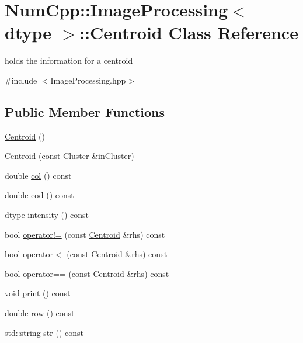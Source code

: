 \hypertarget{class_num_cpp_1_1_image_processing_1_1_centroid}{}\section{Num\+Cpp\+:\+:Image\+Processing$<$ dtype $>$\+:\+:Centroid Class Reference}
\label{class_num_cpp_1_1_image_processing_1_1_centroid}


holds the information for a centroid  




{\ttfamily \#include $<$Image\+Processing.\+hpp$>$}

\subsection*{Public Member Functions}
\begin{DoxyCompactItemize}
\item 
\mbox{\hyperlink{class_num_cpp_1_1_image_processing_1_1_centroid_a75c8e9c6a256f31ca1df7c9ca069fd08}{Centroid}} ()
\item 
\mbox{\hyperlink{class_num_cpp_1_1_image_processing_1_1_centroid_a921b858044ab3f387a10a18df6200855}{Centroid}} (const \mbox{\hyperlink{class_num_cpp_1_1_image_processing_1_1_cluster}{Cluster}} \&in\+Cluster)
\item 
double \mbox{\hyperlink{class_num_cpp_1_1_image_processing_1_1_centroid_a6ae3f070fee5626ddcbd127974e17ae7}{col}} () const
\item 
double \mbox{\hyperlink{class_num_cpp_1_1_image_processing_1_1_centroid_a770b6454957dbf2615522d14e4aa57f2}{eod}} () const
\item 
dtype \mbox{\hyperlink{class_num_cpp_1_1_image_processing_1_1_centroid_ab0e97e8341f54295e5f1be508b539ae8}{intensity}} () const
\item 
bool \mbox{\hyperlink{class_num_cpp_1_1_image_processing_1_1_centroid_a8d4379234d83d9e2be391214d8e6d135}{operator!=}} (const \mbox{\hyperlink{class_num_cpp_1_1_image_processing_1_1_centroid}{Centroid}} \&rhs) const
\item 
bool \mbox{\hyperlink{class_num_cpp_1_1_image_processing_1_1_centroid_a9c5aed897ef47fa6a6933f843b9145ea}{operator$<$}} (const \mbox{\hyperlink{class_num_cpp_1_1_image_processing_1_1_centroid}{Centroid}} \&rhs) const
\item 
bool \mbox{\hyperlink{class_num_cpp_1_1_image_processing_1_1_centroid_af1d8473124ece484e0045b5ede56462f}{operator==}} (const \mbox{\hyperlink{class_num_cpp_1_1_image_processing_1_1_centroid}{Centroid}} \&rhs) const
\item 
void \mbox{\hyperlink{class_num_cpp_1_1_image_processing_1_1_centroid_a45c0fa5857ea4b32e50c9f0a81f8fb28}{print}} () const
\item 
double \mbox{\hyperlink{class_num_cpp_1_1_image_processing_1_1_centroid_ac7cd7464ef23d8f67bf3f979124b54c9}{row}} () const
\item 
std\+::string \mbox{\hyperlink{class_num_cpp_1_1_image_processing_1_1_centroid_a6ba12d36817c5c9385c974e2fedb5de8}{str}} () const
\end{DoxyCompactItemize}

